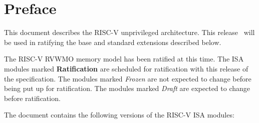 \chapter{Preface}

This document describes the RISC-V unprivileged architecture.  This
release \specrev\ will be used in ratifying the base and standard
extensions described below.

The RISC-V RVWMO memory model has been ratified at this time.  The ISA
modules marked {\bf Ratification} are scheduled for ratification with
this release of the specification.  The modules marked {\em Frozen}
are not expected to change before being put up for ratification.  The
modules marked {\em Draft} are expected to change before ratification.

The document contains the following versions of the RISC-V ISA
modules:

